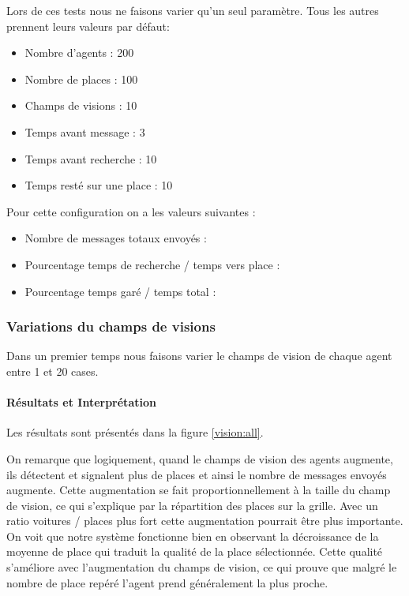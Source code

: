 Lors de ces tests nous ne faisons varier qu'un seul paramètre. Tous les autres prennent leurs valeurs par défaut:\\

\begin{itemize}
\item Nombre d'agents : 200
\item Nombre de places : 100
\item Champs de visions : 10
\item Temps avant message : 3
\item Temps avant recherche : 10
\item Temps resté sur une place : 10\\
\end{itemize}

Pour cette configuration on a les valeurs suivantes :\\

\begin{itemize}
\item Nombre de messages totaux envoyés :
\item Pourcentage temps de recherche / temps vers place : 
\item Pourcentage temps garé / temps total :
\end{itemize}

\subsubsection{Variations du champs de visions}

Dans un premier temps nous faisons varier le champs de vision de chaque agent entre 1 et 20 cases.

\paragraph{Résultats et Interprétation}

Les résultats sont présentés dans la figure \ref{vision:all}.

On remarque que logiquement, quand le champs de vision des agents augmente, ils détectent et signalent plus de places et ainsi le nombre de messages envoyés augmente.
Cette augmentation se fait proportionnellement à la taille du champ de vision, ce qui s'explique par la répartition des places sur la grille. Avec un ratio voitures / places plus fort cette augmentation pourrait être plus importante.\\

On voit que notre système fonctionne bien en observant la décroissance de la moyenne de place qui traduit la qualité de la place sélectionnée. Cette qualité s'améliore avec l'augmentation du champs de vision, ce qui prouve que malgré le nombre de place repéré l'agent prend généralement la plus proche.

